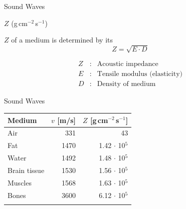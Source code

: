 \begin{frame}{Sound Waves \cont}

     $Z$ (g\,cm$^{-2}$\,s$^{-1}$)

    \vspace{1cm}
    $Z$ of a medium is determined by its 
    \vspace{.2cm}
    $$Z = \sqrt{E \cdot D}$$

    {
            \begin{eqnarray*}
                Z&:& \text{Acoustic impedance}\\
                E&:& \text{Tensile modulus (elasticity)}\\
                D&:& \text{Density of medium}
            \end{eqnarray*}}


\end{frame}


\begin{frame}{Sound Waves \cont}


    \vspace{0.6cm}
    \begin{center}
        \begin{tabular}{lrr}
            \toprule{}
            \textbf{Medium} & $v$ [m/s] & $Z$ [g\,cm$^{-2}$\,s$^{-1}$] \\
            \midrule{}{Air} & 331       & 43                           \\
            {Fat}           & 1470      & 1.42 $\cdot$ 10$^5$          \\
            {Water}         & 1492      & 1.48 $\cdot$ 10$^5$          \\
            {Brain tissue}  & 1530      & 1.56 $\cdot$ 10$^5$          \\
            {Muscles}       & 1568      & 1.63 $\cdot$ 10$^5$          \\
            {Bones}         & 3600      & 6.12 $\cdot$ 10$^5$          \\
            \bottomrule{}
        \end{tabular}
    \end{center}

\end{frame}


